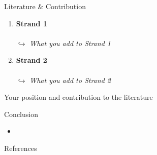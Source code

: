 \documentclass[aspectratio=169]{beamer}
\newcommand{\tight}{\setlength{\itemsep}{0.25em}}
\begin{document}
\begin{frame}{Literature \& Contribution }

\begin{enumerate}
  \setlength\itemsep{0.5em}
  
    \item \textbf{\small\color{NavyBlue} Strand 1 }\\
        {\small \citet{}}
  \\[0.4em]
  $\hookrightarrow$ \textit{\small What you add to Strand 1}
  

  \item \textbf{\color{NavyBlue} Strand 2}\\
        {\small \citet{}}
    \\[0.4em]
  $\hookrightarrow$  \textit{\small What you add to Strand 2}

\end{enumerate}

\begin{tcolorbox}[width=\textwidth, boxrule=1pt, arc=2mm,
                  left=4mm,right=4mm,top=3mm,bottom=3mm,
                  colframe=NavyBlue, colback=LightBlue]
\small\centering
Your position and contribution to the literature


\end{tcolorbox}

\end{frame}



\begin{frame}{Conclusion}


\begin{itemize}\tight
    \item 
\end{itemize}


\vspace{0.5em}


\end{frame}

\begin{frame}{References}
\footnotesize


\end{frame}
\end{document}
